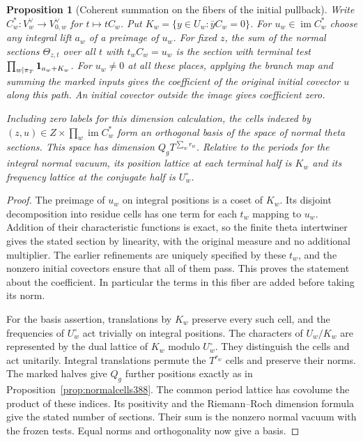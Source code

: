 \documentclass[a4paper,11pt]{article}
\newtheorem{proposition}{Proposition}[section]
\theoremstyle{definition}
\theoremstyle{remark}
\numberwithin{equation}{section}
\begin{document}
\begin{proposition}[Coherent summation on the fibers of the initial pullback]
\label{prop:coherentcell391}
Write \(C_w^*:V_w^\vee\to V_{0,w}^\vee\) for \(t\mapsto tC_w\).
Put \(K_w=\{y\in U_w:\bar y C_w=0\}\). For
\(u_w\in\operatorname{im} C_w^*\) choose any integral lift
\(a_w\) of a preimage of \(u_w\).
For fixed \(z\), the sum of the normal sections
\(\Theta_{z,t}\) over all \(t\) with \(t_wC_w=u_w\) is the
section with terminal test
\(\prod_{w\mid\pi_T}{\bf1}_{a_w+K_w}\). For \(u_w\ne0\)
at all these places, applying the branch map and summing the
marked inputs gives the coefficient of the original initial
covector \(u\) along this path. An initial covector outside
the image gives coefficient zero.

Including zero labels for this dimension calculation, the cells
indexed by \((z,u)\in Z\times\prod_w\operatorname{im}C_w^*\)
form an orthogonal basis of the space of normal theta sections.
This space has dimension \(Q_gT^{\sum_w r_w}\). Relative to
the periods for the integral normal vacuum, its position
lattice at each terminal half is \(K_w\) and its frequency
lattice at the conjugate half is \(U_w^\circ\).
\end{proposition}
\begin{proof}
The preimage of \(u_w\) on integral positions is a coset of
\(K_w\). Its disjoint decomposition into residue cells has
one term for each \(t_w\) mapping to \(u_w\). Addition of
their characteristic functions is exact, so the finite theta
intertwiner gives the stated section by linearity, with the
original measure and no additional multiplier. The earlier
refinements are uniquely specified by these \(t_w\), and
the nonzero initial covectors ensure that all of them pass.
This proves the statement about the coefficient. In particular
the terms in this fiber are added before taking its norm.

For the basis assertion, translations by \(K_w\) preserve
every such cell, and the frequencies of \(U_w^\circ\) act
trivially on integral positions. The characters of \(U_w/K_w\)
are represented by the dual lattice of \(K_w\) modulo
\(U_w^\circ\). They distinguish the cells and act unitarily.
Integral translations permute the \(T^{r_w}\) cells and
preserve their norms. The marked halves give \(Q_g\) further
positions exactly as in Proposition~\ref{prop:normalcells388}.
The common period lattice has covolume the product of these
indices. Its positivity and the Riemann--Roch dimension
formula give the stated number of sections. Their sum is
the nonzero normal vacuum with the frozen tests. Equal norms
and orthogonality now give a basis.
\end{proof}
\end{document}
